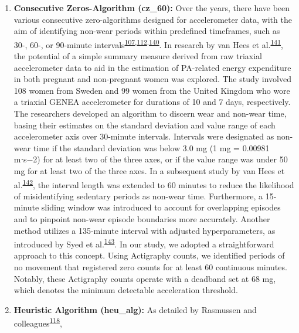 \documentclass[
  10pt,
]{scrbook}
\let\originaltextbf\textbf
\renewcommand{\textbf}[1]{\textcolor{color1}{\textsf{\originaltextbf{#1}}}}
\begin{document}
\begin{enumerate}
\def\labelenumi{\arabic{enumi}.}
\item
  \textsf{\textbf{Consecutive Zeros-Algorithm (cz\_60):}} Over the
  years, there have been various consecutive zero-algorithms designed
  for accelerometer data, with the aim of identifying non-wear periods
  within predefined timeframes, such as 30-, 60-, or 90-minute
  intervals\textsuperscript{\protect\hyperlink{ref-choi_validation_2011}{107},\protect\hyperlink{ref-hecht_methodology_2009}{112},\protect\hyperlink{ref-troiano_physical_2008}{140}}.
  In research by van Hees et
  al.\textsuperscript{\protect\hyperlink{ref-van_hees_estimation_2011}{141}},
  the potential of a simple summary measure derived from raw triaxial
  accelerometer data to aid in the estimation of PA-related energy
  expenditure in both pregnant and non-pregnant women was explored. The
  study involved 108 women from Sweden and 99 women from the United
  Kingdom who wore a triaxial GENEA accelerometer for durations of 10
  and 7 days, respectively. The researchers developed an algorithm to
  discern wear and non-wear time, basing their estimates on the standard
  deviation and value range of each accelerometer axis over 30-minute
  intervals. Intervals were designated as non-wear time if the standard
  deviation was below 3.0 mg (1 mg = 0.00981 m⋅s−2) for at least two of
  the three axes, or if the value range was under 50 mg for at least two
  of the three axes. In a subsequent study by van Hees et
  al.\textsuperscript{\protect\hyperlink{ref-hees_separating_2013}{142}},
  the interval length was extended to 60 minutes to reduce the
  likelihood of misidentifying sedentary periods as non-wear time.
  Furthermore, a 15-minute sliding window was introduced to account for
  overlapping episodes and to pinpoint non-wear episode boundaries more
  accurately. Another method utilizes a 135-minute interval with
  adjusted hyperparameters, as introduced by Syed et
  al.\textsuperscript{\protect\hyperlink{ref-syed_evaluating_2020}{143}}.
  In our study, we adopted a straightforward approach to this concept.
  Using Actigraphy counts, we identified periods of no movement that
  registered zero counts for at least 60 continuous minutes. Notably,
  these Actigraphy counts operate with a deadband set at 68 mg, which
  denotes the minimum detectable acceleration threshold.
\item
  \textsf{\textbf{Heuristic Algorithm (heu\_alg):}} As detailed by
  Rasmussen and
  colleagues\textsuperscript{\protect\hyperlink{ref-rasmussen_short-term_2020}{118}},

\end{enumerate}
\end{document}

